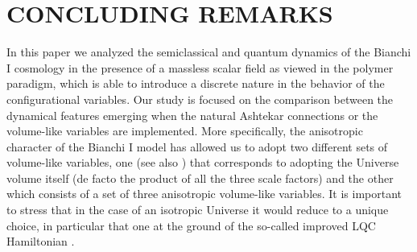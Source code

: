 \documentclass[aps,prd,twocolumn,nofootinbib,superscriptaddress]{revtex4-2}
\begin{document}
\section{CONCLUDING REMARKS\label{con}}

In this paper we analyzed the semiclassical and quantum dynamics of
the Bianchi I cosmology in the presence of a massless scalar field as viewed in the polymer paradigm, which is able to introduce a discrete nature in the behavior of the configurational variables.
Our study is focused on the comparison between the dynamical features emerging
when the natural Ashtekar connections or the volume-like variables are
implemented.
More specifically, the anisotropic character of the Bianchi I model has allowed us to adopt two different sets of volume-like variables,
one \cite{ashtekar2009} (see also \cite{M, Ant}) that corresponds to adopting
the Universe volume itself (de facto the product of all the three scale factors)
and the other \cite{szulc} which consists of a set of three anisotropic volume-like
variables. It is important to stress that in the case of an isotropic
Universe it would reduce to a unique choice, in particular that one at the ground of the so-called improved LQC Hamiltonian
\cite{AshtekarI}.
\end{document}

